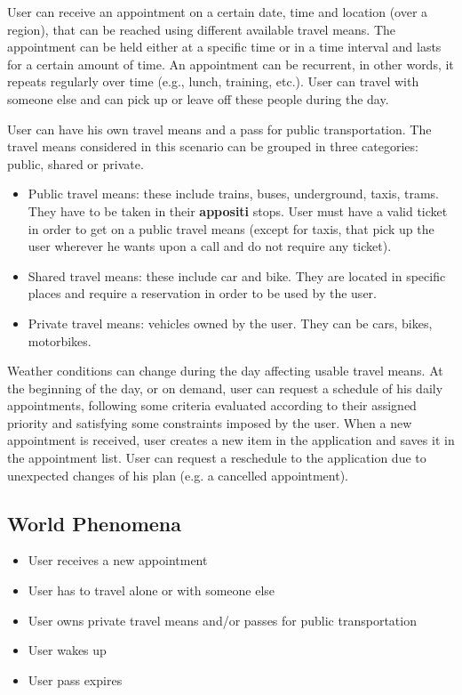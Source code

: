 User can receive an appointment on a certain date, time and location (over a region), that can be reached using different available travel means. The appointment can be held either at a specific time or in a time interval and lasts for a certain amount of time. An appointment can be recurrent, in other words, it repeats regularly over time (e.g., lunch, training, etc.). User can travel with someone else and can pick up or leave off these people during the day.

User can have his own travel means and a pass for public transportation. 
The travel means considered in this scenario can be grouped in three categories: public, shared or private.
\begin{itemize}
\item Public travel means: these include trains, buses, underground, taxis, trams. They have to be taken in their \textbf{appositi} stops. User must have a valid ticket in order to get on a public travel means (except for taxis, that pick up the user wherever he wants upon a call and do not require any ticket). 
\item Shared travel means: these include car and bike. They are located in specific places and require a reservation in order to be used by the user.
\item Private travel means: vehicles owned by the user. They can be cars, bikes, motorbikes.
\end{itemize}

Weather conditions can change during the day affecting usable travel means.
At the beginning of the day, or on demand, user can request a schedule of his daily appointments, following some criteria evaluated according to their assigned priority and satisfying some constraints imposed by the user.
When a new appointment is received, user creates a new item in the application and saves it in the appointment list. User can request a reschedule to the application due to unexpected changes of his plan (e.g. a cancelled appointment).

\subsection{World Phenomena}
\begin{itemize}
\item User receives a new appointment
\item User has to travel alone or with someone else
\item User owns private travel means and/or passes for public transportation
\item User wakes up
\item User pass expires
\end{itemize}

